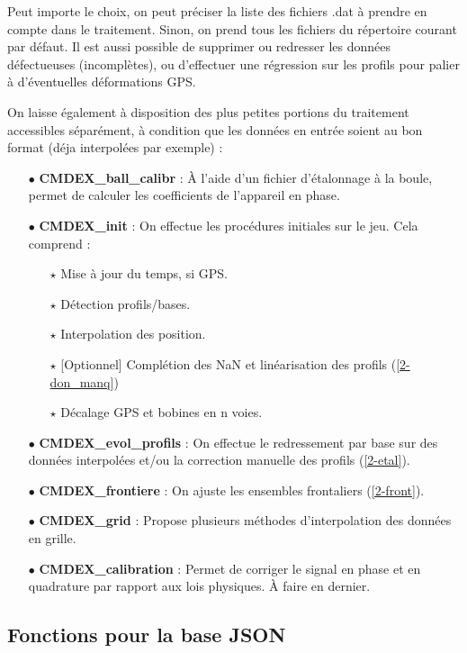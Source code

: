 \documentclass[12pt]{article}
\begin{document}
    Peut importe le choix, on peut préciser la liste des fichiers .dat à prendre en compte dans le traitement. Sinon, on prend tous les fichiers du répertoire courant par défaut. Il est aussi possible de supprimer ou redresser les données défectueuses (incomplètes), ou d'effectuer une régression sur les profils pour palier à d'éventuelles déformations GPS.

    On laisse également à disposition des plus petites portions du traitement accessibles séparément, à condition que les données en entrée soient au bon format (déja interpolées par exemple) :

    \begin{enumerate}
        \item[$\bullet$] \textbf{CMDEX\_ball\_calibr} : À l'aide d'un fichier d'étalonnage à la boule, permet de calculer les coefficients de l'appareil en phase.
        \item[$\bullet$] \textbf{CMDEX\_init} : On effectue les procédures initiales sur le jeu. Cela comprend :
        \begin{enumerate}
            \item[$\star$] Mise à jour du temps, si GPS.
            \item[$\star$] Détection profils/bases.
            \item[$\star$] Interpolation des position.
            \item[$\star$] [Optionnel] Complétion des NaN et linéarisation des profils (\ref{2-don_manq})
            \item[$\star$] Décalage GPS et bobines en n voies.
        \end{enumerate}
        \item[$\bullet$] \textbf{CMDEX\_evol\_profils} : On effectue le redressement par base sur des données interpolées et/ou la correction manuelle des profils (\ref{2-etal}).
        \item[$\bullet$] \textbf{CMDEX\_frontiere} : On ajuste les ensembles frontaliers (\ref{2-front}).
        \item[$\bullet$] \textbf{CMDEX\_grid} : Propose plusieurs méthodes d'interpolation des données en grille.
        \item[$\bullet$] \textbf{CMDEX\_calibration} : Permet de corriger le signal en phase et en quadrature par rapport aux lois physiques. À faire en dernier.
    \end{enumerate}
    
\subsection{Fonctions pour la base JSON}
\end{document}
